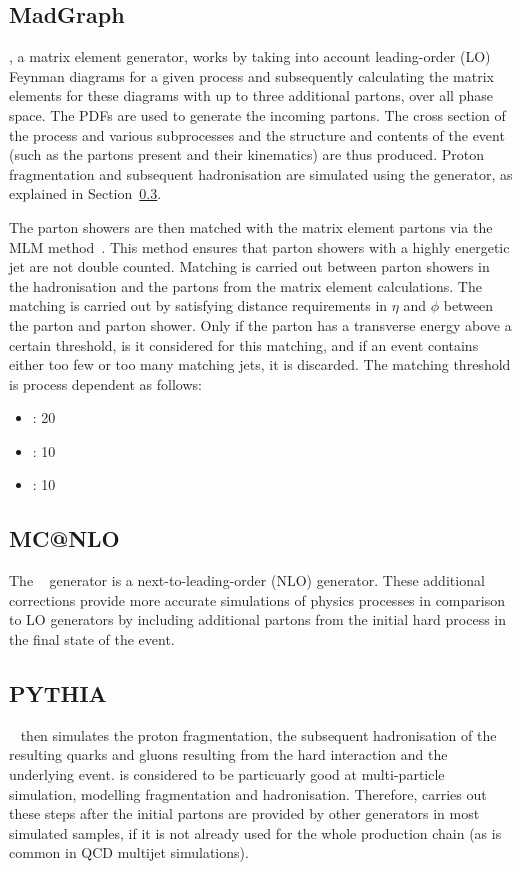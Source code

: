 \subsection{MadGraph}
\label{ss:madgraph}
\MADGRAPH \cite{madgraph5}, a matrix element generator, works by taking into account leading-order (LO)
Feynman diagrams for a given process and subsequently calculating the matrix elements for these diagrams with
up to three additional partons, over all phase space. The PDFs are used to generate the incoming partons. The
cross section of the process and various subprocesses and the structure and contents of the event (such as the
partons present and their kinematics) are thus produced. Proton fragmentation and subsequent hadronisation are
simulated using the \PYTHIA generator, as explained in Section~\ref{ss:pythia}.

The \PYTHIA parton showers are then matched with the matrix element partons via the MLM
method~\cite{Hoche:2006ph}. This method ensures that parton showers with a highly energetic jet are not double
counted. Matching is carried out between parton showers in the hadronisation and the partons from the matrix
element calculations. The matching is carried out by satisfying distance requirements in $\eta$ and $\phi$
between the parton and parton shower. Only if the parton has a transverse energy above a certain threshold, is
it considered for this matching, and if an event contains either too few or too many matching jets, it is
discarded. The matching threshold is process dependent as follows:

\begin{itemize}
  \item \ttbar: 20\GeV
  \item \WpJets: 10\GeV
  \item \ZpJets: 10\GeV
\end{itemize}

\subsection{MC@NLO}
\label{ss:mcatnlo}
The \MCATNLO~\cite{Frixione:2002ik,Frixione:2003ei} generator is a next-to-leading-order (NLO) generator.
These additional corrections provide more accurate simulations of physics processes in comparison to LO
generators by including additional partons from the initial hard process in the final state of the event.

\subsection{PYTHIA}
\label{ss:pythia}
\PYTHIA~\cite{Sjostrand:2006za} then simulates the proton fragmentation, the subsequent hadronisation of the
resulting quarks and gluons resulting from the hard interaction and the underlying event. \PYTHIA is considered to be
particuarly good at multi-particle simulation, modelling fragmentation and hadronisation. Therefore, \PYTHIA
carries out these steps after the initial partons are provided by other generators in most simulated samples,
if it is not already used for the whole production chain (as is common in QCD multijet simulations).

